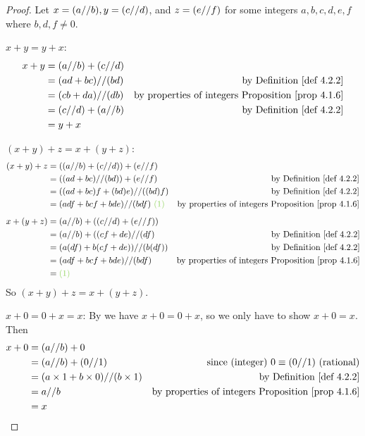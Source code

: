 \begin{proof}
Let \(x = (a \text{//} b), y = (c \text{//} d)\), and \(z = (e \text{//} f)\) for some integers \(a, b, c, d, e, f\) where \(b, d, f \neq 0\).

 \(x + y = y + x\):
\begin{align*}
    x + y & = (a \D b) + (c \D d) \\
          & = (ad + bc) \D (bd) & \text{by \DEF{4.2.2}} \\
          & = (cb + da) \D (db) & \text{by properties of integers \PROP{4.1.6}} \\
          & = (c \D d) + (a \D b) & \text{by \DEF{4.2.2}} \\
          & = y + x
\end{align*}

 \((x + y) + z = x + (y + z)\):
\begin{align*}
    (x + y) + z & = ((a \D b) + (c \D d)) + (e \D f) \\
                & = ((ad + bc) \D (bd)) + (e \D f) & \text{by \DEF{4.2.2}} \\
                & = ((ad + bc)f + (bd)e) \D ((bd)f) & \text{by \DEF{4.2.2}} \\
                & = (adf + bcf + bde) \D (bdf) \GREEN{\ (1)} & \text{by properties of integers \PROP{4.1.6}}
\end{align*}
\begin{align*}
    x + (y + z) & = (a \D b) + ((c \D d) + (e \D f)) \\
                & = (a \D b) + ((cf + de) \D (df) & \text{by \DEF{4.2.2}} \\
                & = (a(df) + b(cf + de)) \D (b(df)) & \text{by \DEF{4.2.2}} \\
                & = (adf + bcf + bde) \D (bdf) & \text{by properties of integers \PROP{4.1.6}} \\
                & = \GREEN{(1)}
\end{align*}
So \((x + y) + z = x + (y + z)\).

 \(x + 0 = 0 + x = x\):
By  we have \(x + 0 = 0 + x\), so we only have to show \(x + 0 = x\).
Then
\begin{align*}
    x + 0 & = (a \D b) + 0 \\
          & = (a \D b) + (0 \D 1) & \text{since (integer) \(0 \equiv (0 \D 1)\) (rational)} \\
          & = (a \X 1 + b \X 0) \D (b \X 1) & \text{by \DEF{4.2.2}} \\
          & = a \D b & \text{by properties of integers \PROP{4.1.6}} \\
          & = x
\end{align*}


\end{proof}
